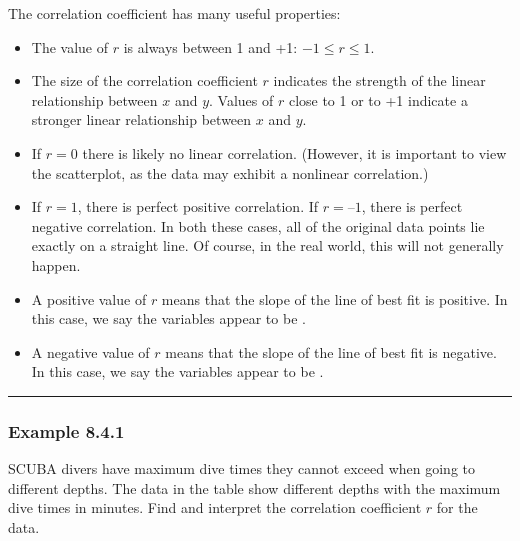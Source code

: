 \documentclass[letterpaper,10pt,english]{jupyterBook}
\begin{document}
\sphinxAtStartPar
The correlation coefficient has many useful properties:
\begin{itemize}
\item {} 
\sphinxAtStartPar
The value of \(r\) is always between \sphinxhyphen{}1 and +1: \(-1 \leq r \leq 1\).

\item {} 
\sphinxAtStartPar
The size of the correlation coefficient \(r\) indicates the strength of the linear relationship between \(x\) and \(y\). Values of \(r\) close to \sphinxhyphen{}1 or to +1 indicate a stronger linear relationship between \(x\) and \(y\).

\item {} 
\sphinxAtStartPar
If \(r = 0\) there is likely no linear correlation. (However, it is important to view the scatterplot, as the data may exhibit a non\sphinxhyphen{}linear correlation.)

\item {} 
\sphinxAtStartPar
If \(r = 1\), there is perfect positive correlation. If \(r = –1\), there is perfect negative correlation. In both these cases, all of the original data points lie exactly on a straight line. Of course, in the real world, this will not generally happen.

\item {} 
\sphinxAtStartPar
A positive value of \(r\) means that the slope of the line of best fit is positive. In this case, we say the variables appear to be .

\item {} 
\sphinxAtStartPar
A negative value of \(r\) means that the slope of the line of best fit is negative. In this case, we say the variables appear to be .

\end{itemize}


\bigskip\hrule\bigskip



\subsubsection{Example 8.4.1}
\label{\detokenize{Ch8 Correlation and Linear Regression/8.4 The Correlation Coefficient:example-8-4-1}}
\sphinxAtStartPar
SCUBA divers have maximum dive times they cannot exceed when going to different depths. The data in the table show different depths with the maximum dive times in minutes. Find and interpret the correlation coefficient \(r\) for the data.
\end{document}
